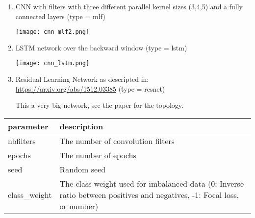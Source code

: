 \documentclass[]{article}
\begin{document}
\begin{enumerate}
\def\labelenumi{\arabic{enumi})}
\setcounter{enumi}{3}
\item
  CNN with filters with three different parallel kernel sizes (3,4,5)
  and a fully connected layers (type = mlf)

  \texttt{[image: cnn\_mlf2.png]}
\item
  LSTM network over the backward window (type = lstm)

  \texttt{[image: cnn\_lstm.png]}
\item
  Residual Learning Network as descripted in:
  \url{https://arxiv.org/abs/1512.03385} (type = resnet)

  This a very big network, see the paper for the topology.
\end{enumerate}

\begin{longtable}[]{@{}ll@{}}
\toprule
\begin{minipage}[b]{0.14\columnwidth}\raggedright\strut
parameter\strut
\end{minipage} & \begin{minipage}[b]{0.35\columnwidth}\raggedright\strut
description\strut
\end{minipage}\tabularnewline
\midrule
\endhead
\begin{minipage}[t]{0.14\columnwidth}\raggedright\strut
nbfilters\strut
\end{minipage} & \begin{minipage}[t]{0.35\columnwidth}\raggedright\strut
The number of convolution filters\strut
\end{minipage}\tabularnewline
\begin{minipage}[t]{0.14\columnwidth}\raggedright\strut
epochs\strut
\end{minipage} & \begin{minipage}[t]{0.35\columnwidth}\raggedright\strut
The number of epochs\strut
\end{minipage}\tabularnewline
\begin{minipage}[t]{0.14\columnwidth}\raggedright\strut
seed\strut
\end{minipage} & \begin{minipage}[t]{0.35\columnwidth}\raggedright\strut
Random seed\strut
\end{minipage}\tabularnewline
\begin{minipage}[t]{0.14\columnwidth}\raggedright\strut
class\_weight\strut
\end{minipage} & \begin{minipage}[t]{0.35\columnwidth}\raggedright\strut
The class weight used for imbalanced data (0: Inverse ratio between
positives and negatives, -1: Focal loss, or number)\strut
\end{minipage}\tabularnewline
\bottomrule
\end{longtable}
\end{document}
